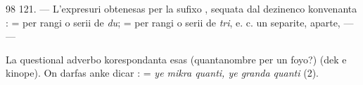 \begin{VUpage}[102]{98}
\VUblanc{5.71pt}%
121. --- L'expresuri  obtenesas per la sufixo\nl
{}, sequata dal dezinenco konvenanta :  = per rangi\nl
o serii de \textit{du};  = per rangi o serii de \textit{tri}, e. c. \nl
un separite, aparte,  ---\nl
{}\nl
{} --- 

La questional adverbo korespondanta esas \nl
{} (quantanombre per un foyo?)\nl
{} (dek e kinope). On darfas anke dicar :\nl
{} = \textit{ye mikra quanti, ye granda quanti} (2).
\end{VUpage}

